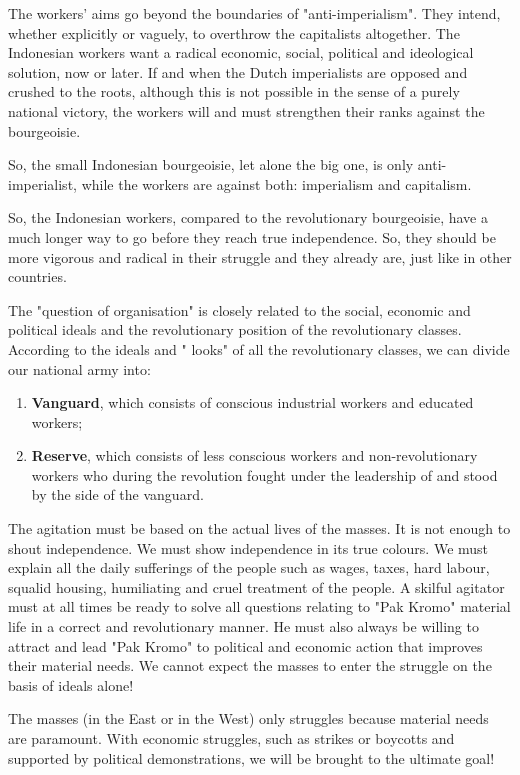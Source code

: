 The workers' aims go beyond the boundaries of "anti-imperialism". They intend, whether explicitly or vaguely, to overthrow the capitalists 
altogether. The Indonesian workers want a radical economic, social, political and ideological solution, now or later. If and when the Dutch 
imperialists are opposed and crushed to the roots, although this is not possible in the sense of a purely national victory, the workers will 
and must strengthen their ranks against the bourgeoisie.\nline

So, the small Indonesian bourgeoisie, let alone the big one, is only anti-imperialist, while the workers are against both: imperialism and capitalism.\nline

So, the Indonesian workers, compared to the revolutionary bourgeoisie, have a much longer way to go before they reach true independence. 
So, they should be more vigorous and radical in their struggle and they already are, just like in other countries.\nline

The "question of organisation" is closely related to the social, economic and political ideals and the revolutionary position of 
the revolutionary classes. According to the ideals and " looks" of all the revolutionary classes, we can divide our national army into: 

\begin{enumerate}
    \item \textbf{Vanguard}, which consists of conscious industrial workers and educated workers;
    \item \textbf{Reserve}, which consists of less conscious workers and non-revolutionary workers who during the revolution fought under the leadership of and stood by the side of the vanguard.
\end{enumerate}

The agitation must be based on the actual lives of the masses. It is not enough to shout independence. We must show independence in its true
colours. We must explain all the daily sufferings of the people such as wages, taxes, hard labour, squalid housing, humiliating and cruel 
treatment of the people. A skilful agitator must at all times be ready to solve all questions relating to "Pak Kromo" material life in a 
correct and revolutionary manner. He must also always be willing to attract and lead "Pak Kromo" to political and economic action that 
improves their material needs. We cannot expect the masses to enter the struggle on the basis of ideals alone!\nline

The masses (in the East or in the West) only struggles because material needs are paramount. With economic struggles,
such as strikes or boycotts and supported by political demonstrations, we will be brought to the ultimate goal!\nline

